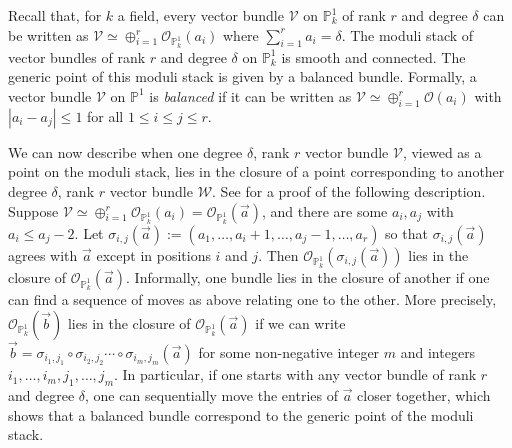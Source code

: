 \documentclass[12 pt]{amsart}
\theoremstyle{plain}
\theoremstyle{definition}
\theoremstyle{remark}
\numberwithin{equation}{section}
\newcommand\bp{\mathbb P}
\newcommand\sce{\mathscr E}
\newcommand\sco{\mathscr O}
\newcommand\scv{\mathscr V}
\newcommand\scw{\mathscr W}
\newcommand\vect[2]{\mathrm{Vect}^{#1}_{#2}} %
\DeclareMathOperator\rk{rk}
\DeclareMathOperator\codim{codim}
\DeclareMathOperator\End{End}
\DeclareMathOperator\aut{Aut}
\begin{document}
Recall that, for $k$ a field, every vector bundle $\scv$ on $\mathbb P^1_k$ of rank $r$
and degree $\delta$ can be written
as $\scv \simeq \oplus_{i=1}^r \sco_{\bp^1_k}(a_i)$ where $\sum_{i=1}^r a_i =
\delta$.
The moduli stack of vector bundles
of rank $r$ and degree $\delta$ on $\bp^1_k$ is smooth and connected.
The generic point of this moduli stack is given by a balanced bundle. 
Formally,
a vector bundle $\scv$ on $\mathbb P^1$ is
{\em balanced} if it can be written as $\scv \simeq \oplus_{i=1}^r
\sco(a_i)$ with $|a_i - a_j| \leq 1$ for all $1 \leq i \leq j
\leq r$.

We can now describe when one degree $\delta$, rank $r$ vector bundle
$\scv$, viewed
as a point on the moduli stack, lies in the closure of a point corresponding to
another degree $\delta$, rank $r$ vector bundle $\scw$.
See \cite[Theorem 14.7(a)]{eisenbudH:3264-&-all-that} for a proof of the
following description.
Suppose $\scv \simeq \oplus_{i=1}^r \sco_{\bp^1_k}(a_i) = \sco_{\bp^1_k}(\vec{a})$, and there are some $a_i, a_j$ with
$a_i \leq a_j-2$. 
Let $\sigma_{i,j}(\vec{a}):= (a_1, \ldots, a_i +1, \ldots, a_j - 1,
\ldots, a_r)$ so that $\sigma_{i,j}(\vec{a})$ agrees with $\vec{a}$ except in positions $i$
and $j$.
Then $\sco_{\bp^1_k}(\sigma_{i,j}(\vec{a}))$ lies in the closure of $\sco_{\bp^1_k}(\vec{a})$.
Informally, one bundle lies in the closure of another if one can find a sequence
of moves as above relating one to the other.
More precisely, $\sco_{\bp^1_k}(\vec{b})$ lies in the closure of
$\sco_{\bp^1_k}(\vec{a})$ if we can write $\vec{b} = \sigma_{i_1, j_1} \circ
\sigma_{i_2, j_2} \cdots \circ
\sigma_{i_m, j_m}(\vec{a})$ for some non-negative integer $m$ and integers $i_1, \ldots, i_m,
j_1, \ldots, j_m$.
In particular, if one starts with any vector bundle of rank $r$ and degree
$\delta$,
one can sequentially move the entries of $\vec{a}$ closer together, which shows
that a balanced bundle correspond to the generic point of the moduli stack.
\end{document}
